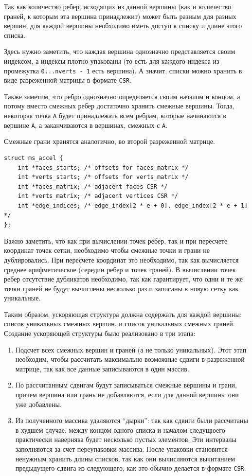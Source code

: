 \documentclass[14pt]{extarticle}
\begin{document}
Так как количество ребер, исходящих из данной вершины (как и количество граней, к которым эта вершина принадлежит) может быть разным для разных вершин, для каждой вершины необходимо иметь доступ к списку и длине этого списка.

Здесь нужно заметить, что каждая вершина однозначно представляется своим индексом, а индексы плотно упакованы (то есть для каждого индекса из промежутка \texttt{0...nverts - 1} есть вершина). А значит, списки можно хранить в виде разреженной матрицы в формате \texttt{CSR}.

Также заметим, что ребро однозначно определяется своим началом и концом, а потому вместо смежных ребер достаточно хранить смежные вершины. Тогда, некоторая точка \texttt{A} будет принадлежать всем ребрам, которые начинаются в вершине \texttt{A}, а заканчиваются в вершинах, смежных с \texttt{A}.

Смежные грани хранятся аналогично, во второй разреженной матрице.
\begin{lstlisting}[caption={Ускоряющая структура}, captionpos=b]
struct ms_accel {
    int *faces_starts; /* offsets for faces_matrix */
    int *verts_starts; /* offsets for verts_matrix */
    int *faces_matrix; /* adjacent faces CSR */
    int *verts_matrix; /* adjacent vertices CSR */
    int *edge_indices; /* edge_index[2 * e + 0], edge_index[2 * e + 1] */
};
\end{lstlisting}

Важно заметить, что как при вычислении точек ребер, так и при пересчете координат точек сетки, необходимо чтобы смежные точки и грани не дублировались. При пересчете координат это необходимо, так как вычисляется среднее арифметическое (середин ребер и точек граней). В вычислении точек ребер отсутствие дубликатов необходимо, так как гарантирует, что одни и те же точки граней не будут вычислены несколько раз и записаны в новую сетку как уникальные.

Таким образом, ускоряющая структура должна содержать для каждой вершины: список уникальных смежных вершин, и список уникальных смежных граней. Создание ускоряющей структуры было реализовано в три этапа:
\begin{enumerate}
\item Подсчет всех смежных вершин и граней (а не только уникальных). Этот этап необходим, чтобы рассчитать максимально возможные сдвиги в разреженной матрице, так как все данные записываются в один массив.
\item По рассчитанным сдвигам будут записываться смежные вершины и грани, причем вершина или грань не добавляются, если для данной вершины они уже добавлены.
\item Из полученного массива удаляются ``дырки'': так как сдвиги были рассчитаны в худшем случае, между концом одного списка и началом следущюего практически наверняка будет несколько пустых элементов. Эти интервалы заполняются за счет переупаковки массива. После упаковки становится ненужным хранить длины списков, так как они вычисляются вычитанием предыдущего сдвига из следующего, как это обычно делается в формате \texttt{CSR}. %
\end{enumerate}
\end{document}

